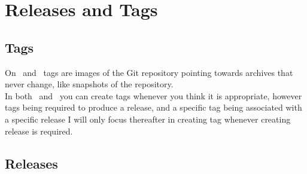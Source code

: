 \clearpage

\section{Releases and Tags}

\subsection{Tags}

On \github\ and \gitlab\ tags are images of the Git repository pointing towards archives that never change, 
like snapshots of the repository. \\
In both \github\ and \gitlab\ you can create tags whenever you think it is appropriate, 
however tags being required to produce a release, and a specific tag being associated with a specific release 
I will only focus thereafter in creating tag whenever creating release is required. 

\subsection{Releases}

